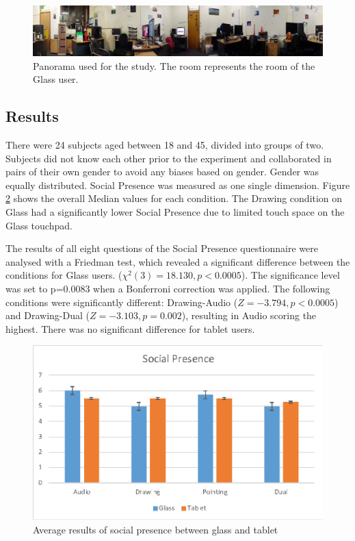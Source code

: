\begin{figure}
    \centering
    \includegraphics[width=\linewidth]{images/63-pano-ismar14/envrionment-setup}
    \caption{Panorama used for the study. The room represents the room of the Glass user.}
    \label{fig:ismar14:envrionment-setup}
\end{figure}

\subsection{Results}

There were 24 subjects aged between 18 and 45, divided into groups of two. Subjects did not know each other prior to the experiment and collaborated in pairs of their own gender to avoid any biases based on gender. Gender was equally distributed. Social Presence was measured as one single dimension. Figure \ref{fig:ismar14:social-presence} shows the overall Median values for each condition. The Drawing condition on Glass had a significantly lower Social Presence due to limited touch space on the Glass touchpad. 

The results of all eight questions of the Social Presence questionnaire were analysed with a Friedman test, which revealed a significant difference between the conditions for Glass users. ($\chi^2(3)=18.130, p<0.0005$). The significance level was set to p=0.0083 when a Bonferroni correction was applied. The following conditions were significantly different: Drawing-Audio ($Z=-3.794, p<0.0005$) and Drawing-Dual ($Z=-3.103, p=0.002$), resulting in Audio scoring the highest. There was no significant difference for tablet users.

\begin{figure}
    \centering
    \includegraphics[width=.8\linewidth]{images/63-pano-ismar14/images-02.eps}
    \caption{Average results of social presence between glass and tablet}
    \label{fig:ismar14:social-presence}
\end{figure}

